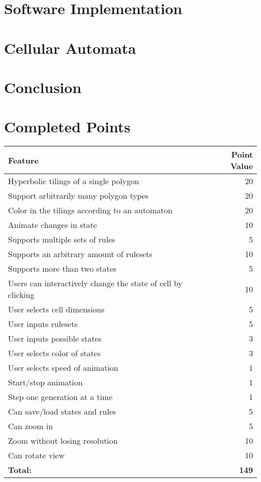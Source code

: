 \documentclass[letterpaper,12pt]{article}
\begin{document}
\section*{Software Implementation}

\section*{Cellular Automata}

\section*{Conclusion}

\section*{Completed Points}






\begin{center}
  \begin{tabular}{ | l | r | }
    \hline
    \textbf{Feature} & \textbf{Point Value} \\ \hline
    Hyperbolic tilings of a single polygon & 20 \\ \hline
    Support arbitrarily many polygon types & 20 \\ \hline
    Color in the tilings according to an automaton & 20 \\ \hline
    Animate changes in state & 10 \\ \hline
    Supports multiple sets of rules & 5 \\ \hline
	Supports an arbitrary amount of rulesets & 10 \\ \hline
	Supports more than two states & 5 \\ \hline
	Users can interactively change the state of cell by clicking & 10 \\ \hline
	User selects cell dimensions & 5 \\ \hline
	User inputs rulesets & 5 \\ \hline
	User inputs possible states & 3 \\ \hline
	User selects color of states & 3 \\ \hline
	User selects speed of animation & 1 \\ \hline
	Start/stop animation & 1 \\ \hline
	Step one generation at a time & 1 \\ \hline
	Can save/load states and rules & 5 \\ \hline
	Can zoom in & 5 \\ \hline
	Zoom without losing resolution & 10 \\ \hline
	Can rotate view & 10 \\ \hline
	\textbf{Total:} & \textbf{149} \\ \hline

  \end{tabular}
\end{center}
\end{document}
